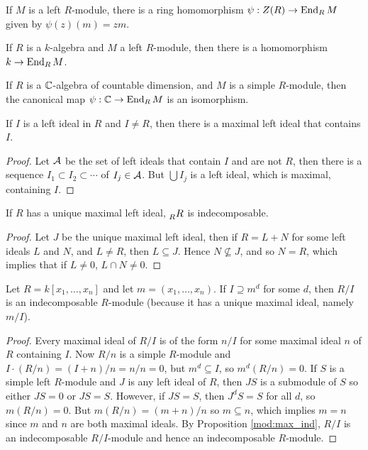   \begin{prop}
    If $M$ is a left $R$-module, there is a ring homomorphism
    $\psi:Z(R)\to\operatorname{End}_R{M}$ given by $\psi(z)(m)=zm$.
  \end{prop}

  \begin{cor}
    If $R$ is a $k$-algebra and $M$ a left $R$-module, then there is a
    homomorphism $k \to\operatorname{End}_R{M}$.
  \end{cor}

  \begin{thm}
    If $R$ is a $\mathbb{C}$-algebra of countable dimension, and $M$ is a simple
    $R$-module, then the canonical map $\psi:\mathbb{C} \to \operatorname{End}_R{M}$ is an
    isomorphism.
  \end{thm}

  \begin{lemma}
    If $I$ is a left ideal in $R$ and $I\neq R$, then there is a maximal
    left ideal that contains $I$.
  \end{lemma}
  \begin{proof}
    Let $\mathcal{A}$ be the set of left ideals that contain $I$ and are not $R$, then
    there is a sequence $I_1 \subset I_2 \subset \cdots$ of $I_j\in \mathcal{A}$. But
    $\bigcup I_j$ is a left ideal, which is maximal, containing $I$.
  \end{proof}

  \begin{prop}\label{mod:max_ind}
    If $R$ has a unique maximal left ideal, $\prescript{}{R}{R}$ is indecomposable.
  \end{prop}
  \begin{proof}
    Let $J$ be the unique maximal left ideal, then if $R = L+N$ for some left
    ideals $L$ and $N$, and $L\neq R$, then $L\subseteq J$. Hence
    $N\not\subseteq J$, and so $N=R$, which implies that  if $L\neq 0$,
    $L\cap N \neq 0$.
  \end{proof}

  \begin{prop}
    Let $R=k[x_1,\ldots,x_n]$ and let $m=(x_1,\ldots,x_n)$. If $I\supseteq m^d$
    for some $d$, then $R/I$ is an indecomposable $R$-module (because it has a
    unique maximal ideal, namely $m/I$).
  \end{prop}
  \begin{proof}
    Every maximal ideal of $R/I$ is of the form $n/I$ for some maximal ideal
    $n$ of $R$ containing $I$. Now $R/n$ is a simple $R$-module and
    $I\cdot(R/n) = (I+n)/n = n/n = 0$, but $m^d \subseteq I$, so $m^d(R/n)=0$.
    If $S$ is a simple left $R$-module and $J$ is any left ideal of $R$, then
    $JS$ is a submodule of $S$ so either $JS = 0$ or $JS = S$. However, if
    $JS=S$, then $J^dS = S$ for all $d$, so $m(R/n) = 0$. But
    $m(R/n) = (m+n)/n$ so $m\subseteq n$, which implies $m = n$ since $m$ and
    $n$ are both maximal ideals. By Proposition \ref{mod:max_ind}, $R/I$ is
    an indecomposable $R/I$-module and hence an indecomposable $R$-module.
  \end{proof}

